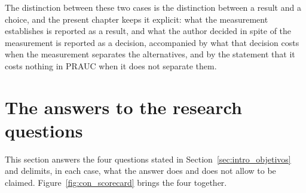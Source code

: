 The distinction between these two cases is the distinction between a result and a choice, and the
present chapter keeps it explicit: what the measurement establishes is reported as a result, and
what the author decided in spite of the measurement is reported as a decision, accompanied by what
that decision costs when the measurement separates the alternatives, and by the statement that it
costs nothing in \gls{PRAUC} when it does not separate them.

\section{The answers to the research questions}
\label{sec:con_respostas}

This section answers the four questions stated in Section~\ref{sec:intro_objetivos} and
delimits, in each case, what the answer does and does not allow to be claimed.
Figure~\ref{fig:con_scorecard} brings the four together.

